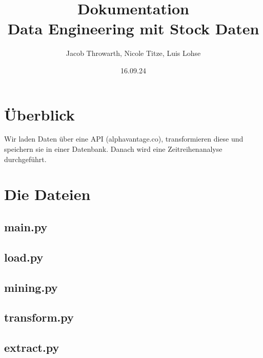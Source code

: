 \documentclass[12pt]{article}
\title{Dokumentation\\Data Engineering mit Stock Daten}
\author{Jacob Throwarth, Nicole Titze, Luis Lohse}
\date{16.09.24}
\begin{document}
\maketitle

\section{Überblick}

Wir laden Daten über eine API (alphavantage.co), transformieren diese und speichern sie in einer Datenbank. Danach wird eine Zeitreihenanalyse durchgeführt.

\section{Die Dateien}
\subsection{main.py}
\subsection{load.py}
\subsection{mining.py}
\subsection{transform.py}
\subsection{extract.py}
\end{document}

